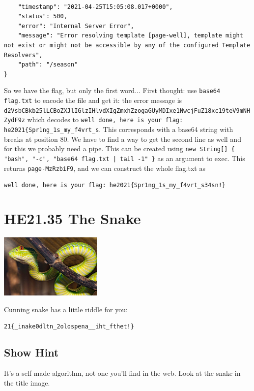 \documentclass[english,a4paper,nols,noindent]{tufte-handout}
\begin{document}
\begin{verbatim}

    "timestamp": "2021-04-25T15:05:08.017+0000",
    "status": 500,
    "error": "Internal Server Error",
    "message": "Error resolving template [page-well], template might not exist or might not be accessible by any of the configured Template Resolvers",
    "path": "/season"
}
\end{verbatim}

So we have the flag, but only the first word...  First thought: use
\verb+base64 flag.txt+ to encode the file and get it: the error
message is
\verb+d2VsbCBkb25lLCBoZXJlIGlzIHlvdXIgZmxhZzogaGUyMDIxe1NwcjFuZ18xc19teV9mNHZydF9z+
which decodes to
\verb+well done, here is your flag: he2021{Spr1ng_1s_my_f4vrt_s+.
  This corresponds with a base64 string with breaks at position 80.
  We have to find a way to get the second line as well and for this we
  probably need a pipe.  This can be created using 
  \verb+new String[] { "bash", "-c", "base64 flag.txt | tail -1" }+ as
  an argument to exec.  This returns \verb+page-MzRzbiF9+, and we can
  construct the whole flag.txt as

  \verb+well done, here is your flag: he2021{Spr1ng_1s_my_f4vrt_s34sn!}+
  

\hypertarget{he21.35}{%
\section{HE21.35 The Snake}
  \label{he21.35}}
\begin{marginfigure}
    \includegraphics[width=50mm]{images/challenge35.jpg}
\end{marginfigure}

\noindent Cunning snake has a little riddle for you:

\verb+21{_inake0dltn_2olospena__iht_fthet!}+

\subsection{Show Hint}
It's a self-made algorithm, not one you'll find in the web.
Look at the snake in the title image.
\end{document}
